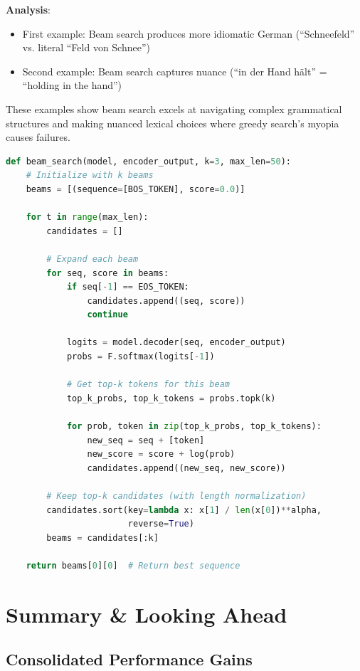 \documentclass{article}
\begin{document}
\textbf{Analysis}:
\begin{itemize}
\item First example: Beam search produces more idiomatic German (``Schneefeld'' vs. literal ``Feld von Schnee'')
\item Second example: Beam search captures nuance (``in der Hand hält'' = ``holding in the hand'')
\end{itemize}

These examples show beam search excels at navigating complex grammatical structures and making nuanced lexical choices where greedy search's myopia causes failures.

\begin{lstlisting}[language=Python, caption=Beam Search Implementation Sketch]
def beam_search(model, encoder_output, k=3, max_len=50):
    # Initialize with k beams
    beams = [(sequence=[BOS_TOKEN], score=0.0)]
    
    for t in range(max_len):
        candidates = []
        
        # Expand each beam
        for seq, score in beams:
            if seq[-1] == EOS_TOKEN:
                candidates.append((seq, score))
                continue
            
            logits = model.decoder(seq, encoder_output)
            probs = F.softmax(logits[-1])
            
            # Get top-k tokens for this beam
            top_k_probs, top_k_tokens = probs.topk(k)
            
            for prob, token in zip(top_k_probs, top_k_tokens):
                new_seq = seq + [token]
                new_score = score + log(prob)
                candidates.append((new_seq, new_score))
        
        # Keep top-k candidates (with length normalization)
        candidates.sort(key=lambda x: x[1] / len(x[0])**alpha, 
                        reverse=True)
        beams = candidates[:k]
    
    return beams[0][0]  # Return best sequence
\end{lstlisting}

\section{Summary \& Looking Ahead}

\subsection{Consolidated Performance Gains}
\end{document}
